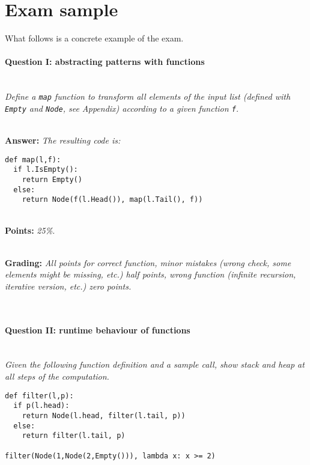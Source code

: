\section*{Exam sample}
What follows is a concrete example of the exam.


\paragraph{Question I: abstracting patterns with functions} \ \\

\textit{Define a \texttt{map} function to transform all elements of the input list (defined with \texttt{Empty} and \texttt{Node}, see Appendix) according to a given function \texttt{f}.}

\ \\ 

\textbf{Answer:} \textit{The resulting code is:}

\begin{lstlisting}
def map(l,f):
  if l.IsEmpty():
    return Empty()
  else:
    return Node(f(l.Head()), map(l.Tail(), f))
\end{lstlisting}

\ \\ 

\textbf{Points:} \textit{25\%.}

\ \\ 

\textbf{Grading:} \textit{All points for correct function, minor mistakes (wrong check, some elements might be missing, etc.) half points, wrong function (infinite recursion, iterative version, etc.) zero points.}

\ \\ 

\paragraph{Question II: runtime behaviour of functions} \ \\

\textit{Given the following function definition and a sample call, show stack and heap at all steps of the computation.}

\begin{lstlisting}
def filter(l,p):
  if p(l.head):
    return Node(l.head, filter(l.tail, p))
  else:
    return filter(l.tail, p)

filter(Node(1,Node(2,Empty())), lambda x: x >= 2)
\end{lstlisting}


